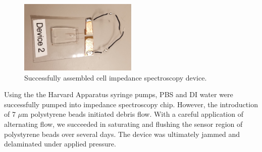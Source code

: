 \begin{figure}[h]
    \centering
    \includegraphics[width=0.5\textwidth]{images/device_22.jpg}
    \caption{Successfully assembled cell impedance spectroscopy device.}
    \label{fig:assembled_good_device}
\end{figure}

\par Using the the Harvard Apparatus syringe pumps, PBS and DI water were successfully pumped into impedance spectroscopy chip. However, the introduction of 7 $\mu$m polystyrene beads initiated debris flow. With a careful application of alternating flow, we succeeded in saturating and flushing the sensor region of polystyrene beads over several days. The device was ultimately jammed and delaminated under applied pressure.

